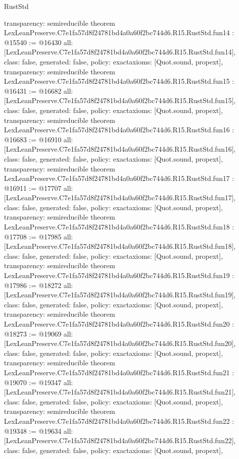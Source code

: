 \begin{lexlean}{RustStd}
\begin{coremodule}
{  transparency: semireducible
}
theorem LexLeanPreserve.C7e1fa57d8f24781bd4a0a60f2bc744d6.R15.RustStd.fun14 : @15540 := @16430 {
  all: [LexLeanPreserve.C7e1fa57d8f24781bd4a0a60f2bc744d6.R15.RustStd.fun14],
  class: false,
  generated: false,
  policy: exact{axioms: [Quot.sound, propext]},
  transparency: semireducible
}
theorem LexLeanPreserve.C7e1fa57d8f24781bd4a0a60f2bc744d6.R15.RustStd.fun15 : @16431 := @16682 {
  all: [LexLeanPreserve.C7e1fa57d8f24781bd4a0a60f2bc744d6.R15.RustStd.fun15],
  class: false,
  generated: false,
  policy: exact{axioms: [Quot.sound, propext]},
  transparency: semireducible
}
theorem LexLeanPreserve.C7e1fa57d8f24781bd4a0a60f2bc744d6.R15.RustStd.fun16 : @16683 := @16910 {
  all: [LexLeanPreserve.C7e1fa57d8f24781bd4a0a60f2bc744d6.R15.RustStd.fun16],
  class: false,
  generated: false,
  policy: exact{axioms: [Quot.sound, propext]},
  transparency: semireducible
}
theorem LexLeanPreserve.C7e1fa57d8f24781bd4a0a60f2bc744d6.R15.RustStd.fun17 : @16911 := @17707 {
  all: [LexLeanPreserve.C7e1fa57d8f24781bd4a0a60f2bc744d6.R15.RustStd.fun17],
  class: false,
  generated: false,
  policy: exact{axioms: [Quot.sound, propext]},
  transparency: semireducible
}
theorem LexLeanPreserve.C7e1fa57d8f24781bd4a0a60f2bc744d6.R15.RustStd.fun18 : @17708 := @17985 {
  all: [LexLeanPreserve.C7e1fa57d8f24781bd4a0a60f2bc744d6.R15.RustStd.fun18],
  class: false,
  generated: false,
  policy: exact{axioms: [Quot.sound, propext]},
  transparency: semireducible
}
theorem LexLeanPreserve.C7e1fa57d8f24781bd4a0a60f2bc744d6.R15.RustStd.fun19 : @17986 := @18272 {
  all: [LexLeanPreserve.C7e1fa57d8f24781bd4a0a60f2bc744d6.R15.RustStd.fun19],
  class: false,
  generated: false,
  policy: exact{axioms: [Quot.sound, propext]},
  transparency: semireducible
}
theorem LexLeanPreserve.C7e1fa57d8f24781bd4a0a60f2bc744d6.R15.RustStd.fun20 : @18273 := @19069 {
  all: [LexLeanPreserve.C7e1fa57d8f24781bd4a0a60f2bc744d6.R15.RustStd.fun20],
  class: false,
  generated: false,
  policy: exact{axioms: [Quot.sound, propext]},
  transparency: semireducible
}
theorem LexLeanPreserve.C7e1fa57d8f24781bd4a0a60f2bc744d6.R15.RustStd.fun21 : @19070 := @19347 {
  all: [LexLeanPreserve.C7e1fa57d8f24781bd4a0a60f2bc744d6.R15.RustStd.fun21],
  class: false,
  generated: false,
  policy: exact{axioms: [Quot.sound, propext]},
  transparency: semireducible
}
theorem LexLeanPreserve.C7e1fa57d8f24781bd4a0a60f2bc744d6.R15.RustStd.fun22 : @19348 := @19634 {
  all: [LexLeanPreserve.C7e1fa57d8f24781bd4a0a60f2bc744d6.R15.RustStd.fun22],
  class: false,
  generated: false,
  policy: exact{axioms: [Quot.sound, propext]},
}
\end{coremodule}
\end{lexlean}
